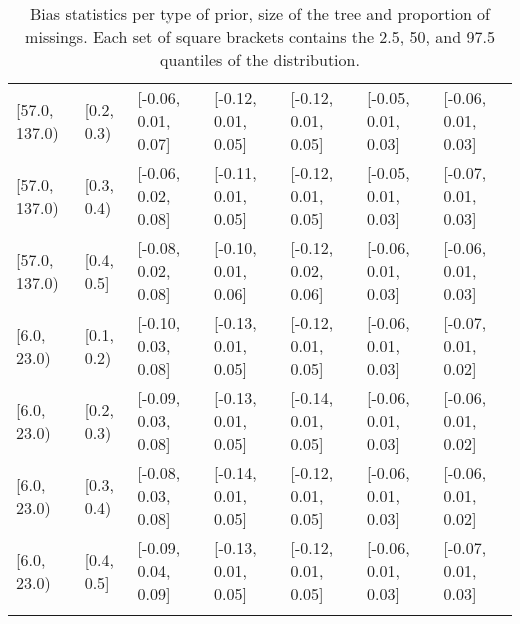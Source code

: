 \begin{table}[ht]
\begin{tabular}{lllllll}
  {[57.0, 137.0)} & {[0.2, 0.3)} & {[-0.06, 0.01, 0.07]} & {[-0.12, 0.01, 0.05]} & {[-0.12, 0.01, 0.05]} & {[-0.05, 0.01, 0.03]} & {[-0.06, 0.01, 0.03]} \\ 
  {[57.0, 137.0)} & {[0.3, 0.4)} & {[-0.06, 0.02, 0.08]} & {[-0.11, 0.01, 0.05]} & {[-0.12, 0.01, 0.05]} & {[-0.05, 0.01, 0.03]} & {[-0.07, 0.01, 0.03]} \\ 
  {[57.0, 137.0)} & {[0.4, 0.5]} & {[-0.08, 0.02, 0.08]} & {[-0.10, 0.01, 0.06]} & {[-0.12, 0.02, 0.06]} & {[-0.06, 0.01, 0.03]} & {[-0.06, 0.01, 0.03]} \\ 
  {[6.0, 23.0)} & {[0.1, 0.2)} & {[-0.10, 0.03, 0.08]} & {[-0.13, 0.01, 0.05]} & {[-0.12, 0.01, 0.05]} & {[-0.06, 0.01, 0.03]} & {[-0.07, 0.01, 0.02]} \\ 
  {[6.0, 23.0)} & {[0.2, 0.3)} & {[-0.09, 0.03, 0.08]} & {[-0.13, 0.01, 0.05]} & {[-0.14, 0.01, 0.05]} & {[-0.06, 0.01, 0.03]} & {[-0.06, 0.01, 0.02]} \\ 
  {[6.0, 23.0)} & {[0.3, 0.4)} & {[-0.08, 0.03, 0.08]} & {[-0.14, 0.01, 0.05]} & {[-0.12, 0.01, 0.05]} & {[-0.06, 0.01, 0.03]} & {[-0.06, 0.01, 0.02]} \\ 
  {[6.0, 23.0)} & {[0.4, 0.5]} & {[-0.09, 0.04, 0.09]} & {[-0.13, 0.01, 0.05]} & {[-0.12, 0.01, 0.05]} & {[-0.06, 0.01, 0.03]} & {[-0.07, 0.01, 0.03]} \\ 
   \bottomrule
\multicolumn{7}{l}{}\\
\end{tabular}
\caption{Bias statistics per type of prior, size of the tree and proportion of missings. Each set of square brackets contains the 2.5, 50, and 97.5 quantiles of the distribution.} 
\label{tab:bias-prior-size-missigness}
\end{table}
